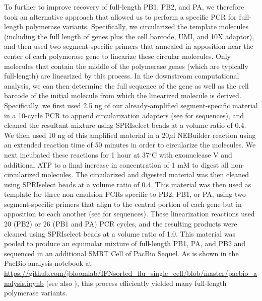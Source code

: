 \documentclass[9pt,lineno]{template}
\begin{document}
To further to improve recovery of full-length PB1, PB2, and PA, we therefore took an alternative approach that allowed us to perform a specific PCR for full-length polymerase variants.
Specifically, we circularized the template molecules (including the full length of genes plus the cell barcode, UMI, and 10X adaptor), and then used two segment-specific primers that annealed in apposition near the center of each polymerase gene to linearize these circular molecules.
Only molecules that contain the middle of the polymerase genes (which are typically full-length) are linearized by this process.
In the downstream computational analysis, we can then determine the full sequence of the gene as well as the cell barcode of the initial molecule from which the linearized molecule is derived.
Specifically, we first used 2.5 ng of our already-amplified segment-specific material in a 10-cycle PCR to append circularization adapters (see  for sequences), and cleaned the resultant mixture using SPRIselect beads at a volume ratio of 0.4.
We then used 10 ng of this amplified material in a 20$\mu$l NEBuilder reaction using an extended reaction time of 50 minutes in order to circularize the molecules.
We next incubated these reactions for 1 hour at 37$^{\circ}$C with exonuclease V and additional ATP to a final increase in concentration of 1 mM to digest all non-circularized molecules.
The circularized and digested material was then cleaned using SPRIselect beads at a volume ratio of 0.4.
This material was then used as template for three non-emulsion PCRs specific to PB2, PB1, or PA, using two segment-specific primers that align to the central portion of each gene but in apposition to each another (see  for sequences).
These linearization reactions used 20 (PB2) or 26 (PB1 and PA) PCR cycles, and the resulting products were cleaned using SPRIselect beads at a volume ratio of 1.0.
This material was pooled to produce an equimolar mixture of full-length PB1, PA, and PB2 and sequenced in an additional SMRT Cell of PacBio Sequel. 
As is shown in the PacBio analysis notebook at \url{https://github.com/jbloomlab/IFNsorted_flu_single_cell/blob/master/pacbio_analysis.ipynb} (see also ), this process efficiently yielded many full-length polymerase variants.
\end{document}
